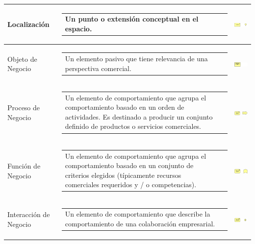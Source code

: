 \begin{longtable}[c]{|p{2.5cm}|l|c|}
	Localización    			& \begin{tabular}[c]{p{7cm}@{}l@{}}Un punto o extensión conceptual en el espacio.\end{tabular} & \includegraphics[width=35mm]{arquitectura/adm_lenguaje/imgs/business/Location}          \\ \hline
	Objeto de Negocio    		& \begin{tabular}[c]{p{7cm}@{}l@{}}Un elemento pasivo que tiene relevancia de una perspectiva comercial.\end{tabular} & \includegraphics[width=35mm]{arquitectura/adm_lenguaje/imgs/business/BusinessObject}          \\ \hline
	Proceso de Negocio    		& \begin{tabular}[c]{p{7cm}@{}l@{}}Un elemento de comportamiento que agrupa el comportamiento basado en un orden de actividades. Es destinado a producir un conjunto definido de productos o servicios comerciales.\end{tabular} & \includegraphics[width=35mm]{arquitectura/adm_lenguaje/imgs/business/BusinessProcess}          \\ \hline		
	Función de Negocio    		& \begin{tabular}[c]{p{7cm}@{}l@{}}Un elemento de comportamiento que agrupa el comportamiento basado en un conjunto de criterios elegidos (típicamente recursos comerciales requeridos y / o competencias).\end{tabular} & \includegraphics[width=35mm]{arquitectura/adm_lenguaje/imgs/business/BusinessFunction}          \\ \hline
	Interacción de Negocio    	& \begin{tabular}[c]{p{7cm}@{}l@{}}Un elemento de comportamiento que describe la comportamiento de una colaboración empresarial.\end{tabular} & \includegraphics[width=35mm]{arquitectura/adm_lenguaje/imgs/business/BusinessInteraction}          \\ \hline

\end{longtable}
